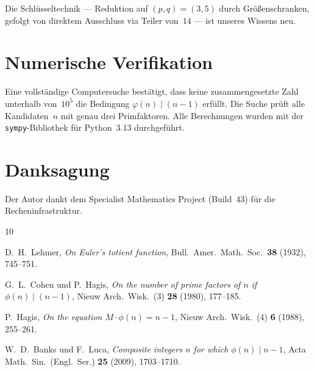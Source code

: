 \documentclass[12pt,a4paper]{amsart}
\theoremstyle{definition}
\newcommand{\euler}{\varphi}
\begin{document}
Die Schlüsseltechnik — Reduktion auf $(p,q) = (3,5)$ durch Größenschranken,
gefolgt von direktem Ausschluss via Teiler von~$14$ — ist unseres Wissens neu.

\section{Numerische Verifikation}

Eine vollständige Computersuche bestätigt, dass keine zusammengesetzte Zahl
unterhalb von~$10^5$ die Bedingung $\euler(n) \mid (n-1)$ erfüllt.
Die Suche prüft alle Kandidaten~$n$ mit genau drei Primfaktoren.
Alle Berechnungen wurden mit der \texttt{sympy}-Bibliothek für Python~3.13
durchgeführt.

\section*{Danksagung}

Der Autor dankt dem Specialist Mathematics Project (Build~43) für die
Recheninfrastruktur.

\begin{thebibliography}{10}

D.~H.~Lehmer,
\emph{On Euler's totient function},
Bull.\ Amer.\ Math.\ Soc.\ \textbf{38} (1932), 745--751.

G.~L.~Cohen und P.~Hagis,
\emph{On the number of prime factors of $n$ if $\phi(n) \mid (n-1)$},
Nieuw Arch.\ Wisk.\ (3) \textbf{28} (1980), 177--185.

P.~Hagis,
\emph{On the equation $M \cdot \phi(n) = n - 1$},
Nieuw Arch.\ Wisk.\ (4) \textbf{6} (1988), 255--261.

W.~D.~Banks und F.~Luca,
\emph{Composite integers $n$ for which $\phi(n) \mid n - 1$},
Acta Math.\ Sin.\ (Engl.\ Ser.) \textbf{25} (2009), 1703--1710.

\end{thebibliography}
\end{document}
